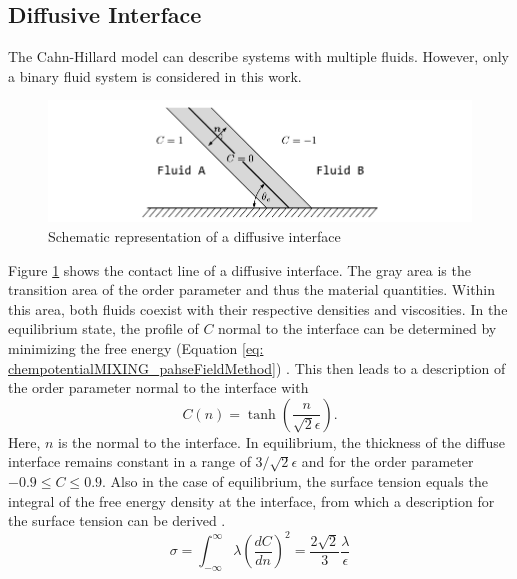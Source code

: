 \subsection{Diffusive Interface}
The Cahn-Hillard model can describe systems with multiple fluids. However, only a binary fluid system is considered in this work.
\begin{figure}[h]
    \centering
    \includegraphics[width=.95\textwidth]{Pictures/DiffusiveInterface.pdf}
    \caption{Schematic representation of a diffusive interface}
    \label{fig: DiffusiveInteraface}
\end{figure}
Figure \ref{fig: DiffusiveInteraface} shows the contact line of a diffusive interface. The gray area is the transition area of the order parameter and thus the material quantities. Within this area, both fluids coexist with their respective densities and viscosities. In the equilibrium state, the profile of $C$ normal to the interface can be determined by minimizing the free energy (Equation \ref{eq: chempotentialMIXING_pahseFieldMethod}) \cite{cai2015NumericalSimulationWetting}. This then leads to a description of the order parameter normal to the interface with
\begin{equation}
    \label{eq: InterfactialNormalDirProfile}
    C(n) = \tanh\left(\frac{n}{\sqrt{2}\epsilon}\right).
\end{equation}
Here, $n$ is the normal to the interface. In equilibrium, the thickness of the diffuse interface remains constant in a range of $3/\sqrt{2}\epsilon$ and for the order parameter $-0.9\leq C\leq0.9$. Also in the case of equilibrium, the surface tension equals the integral of the free energy density at the interface, from which a description for the surface tension can be derived \cite{jacqmin2000ContactlineDynamicsDiffuse}.
\begin{equation}
\label{eq: surfacetensionEqui}
    \sigma = \int_{-\infty}^{\infty}\lambda\left( \frac{dC}{dn}  \right)^{2}= \frac{2\sqrt{2}}{3} \frac{\lambda}{\epsilon}
\end{equation}

